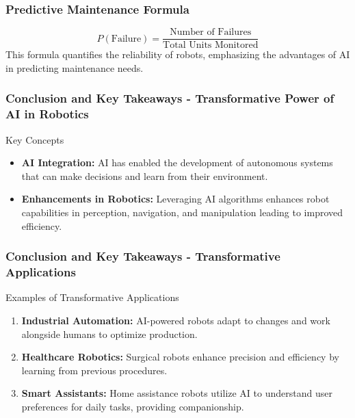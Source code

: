 \documentclass[aspectratio=169]{beamer}
\begin{document}
\begin{frame}[fragile]
    \frametitle{Predictive Maintenance Formula}
    \begin{equation}
        P(\text{Failure}) = \frac{\text{Number of Failures}}{\text{Total Units Monitored}}
    \end{equation}
    This formula quantifies the reliability of robots, emphasizing the advantages of AI in predicting maintenance needs.
\end{frame}

\begin{frame}[fragile]
    \frametitle{Conclusion and Key Takeaways - Transformative Power of AI in Robotics}

    \begin{block}{Key Concepts}
        \begin{itemize}
            \item \textbf{AI Integration:} AI has enabled the development of autonomous systems that can make decisions and learn from their environment.
            \item \textbf{Enhancements in Robotics:} Leveraging AI algorithms enhances robot capabilities in perception, navigation, and manipulation leading to improved efficiency.
        \end{itemize}
    \end{block}
\end{frame}

\begin{frame}[fragile]
    \frametitle{Conclusion and Key Takeaways - Transformative Applications}

    \begin{block}{Examples of Transformative Applications}
        \begin{enumerate}
            \item \textbf{Industrial Automation:} AI-powered robots adapt to changes and work alongside humans to optimize production.
            \item \textbf{Healthcare Robotics:} Surgical robots enhance precision and efficiency by learning from previous procedures.
            \item \textbf{Smart Assistants:} Home assistance robots utilize AI to understand user preferences for daily tasks, providing companionship.
        \end{enumerate}
    \end{block}
\end{frame}
\end{document}
